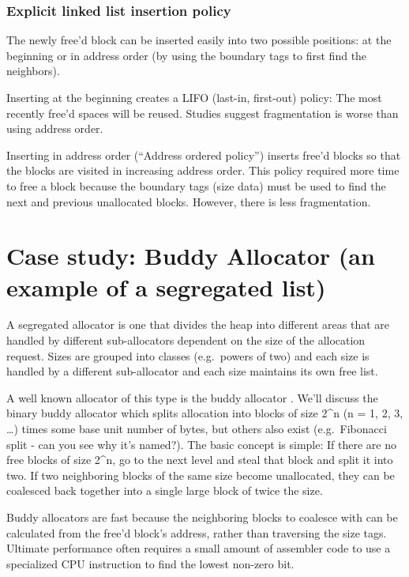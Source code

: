 \subsubsection{Explicit linked list insertion policy}

The newly free'd block can be inserted easily into two possible positions: at the beginning or in address order (by using the boundary tags to first find the neighbors).

Inserting at the beginning creates a LIFO (last-in, first-out) policy: The most recently free'd spaces will be reused. Studies suggest fragmentation is worse than using address order.

Inserting in address order (``Address ordered policy'') inserts free'd blocks so that the blocks are visited in increasing address order. This policy required more time to free a block because the boundary tags (size data) must be used to find the next and previous unallocated blocks. However, there is less fragmentation.

\section{Case study: Buddy Allocator (an example of a segregated list)}

A segregated allocator is one that divides the heap into different areas that are handled by different sub-allocators dependent on the size of the allocation request. Sizes are grouped into classes (e.g.~powers of two) and each size is handled by a different sub-allocator and each size maintains its own free list.

A well known allocator of this type is the buddy allocator \cite[P. 85]{rangan1999foundations}. We'll discuss the binary buddy allocator which splits allocation into blocks of size 2\^{}n (n = 1, 2, 3, \ldots{}) times some base unit number of bytes, but others also exist (e.g.~Fibonacci split - can you see why it's named?). The basic concept is simple: If there are no free blocks of size 2\^{}n, go to the next level and steal that block and split it into two. If two neighboring blocks of the same size become unallocated, they can be coalesced back together into a single large block of twice the size.

Buddy allocators are fast because the neighboring blocks to coalesce with can be calculated from the free'd block's address, rather than traversing the size tags. Ultimate performance often requires a small amount of assembler code to use a specialized CPU instruction to find the lowest non-zero bit.

